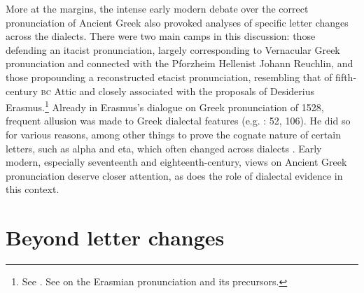 More at the margins, the intense early modern debate over the correct pronunciation of Ancient Greek also provoked analyses of specific letter changes across the dialects. There were two main camps in this discussion: those defending an itacist pronunciation, largely corresponding to Vernacular Greek pronunciation and connected with the Pforzheim Hellenist Johann Reuchlin, and those propounding a reconstructed etacist pronunciation, resembling that of fifth-century \textsc{bc} Attic and closely associated with the proposals of Desiderius Erasmus.\footnote{See \citet[130]{Sandys1908}. See \citet{Bywater1908} on the Erasmian pronunciation and its precursors.} Already in Erasmus’s dialogue on Greek pronunciation of 1528, frequent allusion was made to Greek dialectal features (e.g. \citealt{Erasmus1528}: 52, 106). He did so for various reasons, among other things to prove the cognate nature of certain letters, such as alpha and eta, which often changed across dialects \citep[62]{Erasmus1528}. Early modern, especially seventeenth and eighteenth-century, views on Ancient Greek pronunciation deserve closer attention, as does the role of dialectal evidence in this context.

\section{Beyond letter changes}\label{sec:6.3}

